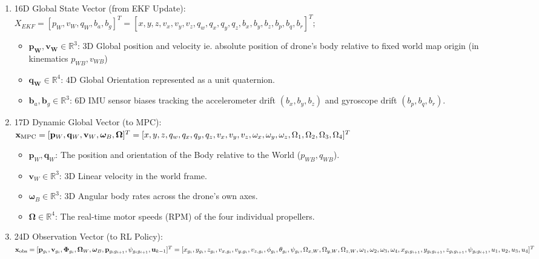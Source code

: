 \documentclass{article}
\begin{document}
\begin{enumerate}
    \item 16D Global State Vector (from EKF Update):  \\
    $X_{EKF} = [p_W, v_W, q_W, b_a, b_g]^T = [x,y,z,v_x,v_y,v_z,q_w, q_x, q_y, q_z, b_x, b_y, b_z, b_p, b_q, b_r]^T;$
    \begin{itemize}
    \item $\mathbf{p_W}, \mathbf{v_W} \in \mathbb{R}^3$: 3D Global position and velocity ie. absolute position of drone's body relative to fixed world map origin (in kinematics $p_{WB}, v_{WB}$)
    \item $\mathbf{q_W} \in \mathbb{R}^4$: 4D Global Orientation represented as a unit quaternion.
    \item $\mathbf{b}_a, \mathbf{b}_g \in \mathbb{R}^3$: 6D IMU sensor biases tracking the accelerometer drift $(b_x, b_y, b_z)$ and gyroscope drift $(b_p, b_q, b_r)$.
    \end{itemize}
    \item 17D Dynamic Global Vector (to MPC): \\
    $\mathbf{x}_{\text{MPC}} = [\mathbf{p}_{W}, \mathbf{q}_{W}, \mathbf{v}_W, \boldsymbol{\omega}_B, \boldsymbol{\Omega}]^T \\= [x, y, z, q_{w}, q_{x}, q_{y}, q_{z}, v_{x}, v_{y}, v_{z}, \omega_{x}, \omega_{y}, \omega_{z}, \Omega_1, \Omega_2, \Omega_3, \Omega_4]^T$
    \begin{itemize}
    \item $\mathbf{p}_{W}, \mathbf{q}_{W}$: The position and orientation of the Body relative to the World ($p_{WB}, q_{WB}$).
    \item $\mathbf{v}_W \in \mathbb{R}^3$: 3D Linear velocity in the world frame.
    \item $\boldsymbol{\omega}_B \in \mathbb{R}^3$: 3D Angular body rates across the drone's own axes.
    \item $\boldsymbol{\Omega} \in \mathbb{R}^4$: The real-time motor speeds (RPM) of the four individual propellers.
    \end{itemize}
    \item 24D Observation Vector (to RL Policy): \\
    $\mathbf{x}_{\text{obs}} = [\mathbf{p}_{g_i}, \mathbf{v}_{g_i}, \mathbf{\Phi}_{g_i}, \mathbf{\Omega}_W, \boldsymbol{\omega}_B, \mathbf{p}_{g_i g_{i+1}}, \psi_{g_i g_{i+1}}, \mathbf{u}_{k-1}]^T \\= [x_{g_i}, y_{g_i}, z_{g_i}, v_{x,g_i}, v_{y,g_i}, v_{z,g_i}, \phi_{g_i}, \theta_{g_i}, \psi_{g_i}, \Omega_{x,W}, \Omega_{y,W}, \Omega_{z,W}, \omega_1, \omega_2, \omega_3, \omega_4, \\x_{g_i g_{i+1}}, y_{g_i g_{i+1}}, z_{g_i g_{i+1}}, \psi_{g_i g_{i+1}}, u_1, u_2, u_3, u_4]^T$

\end{enumerate}
\end{document}
